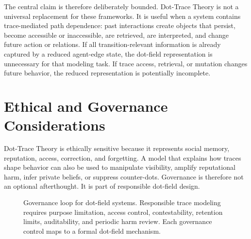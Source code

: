 \documentclass[11pt]{article}
\theoremstyle{remark}
\begin{document}
The central claim is therefore deliberately bounded. Dot-Trace Theory is not a universal replacement for these frameworks. It is useful when a system contains trace-mediated path dependence: past interactions create objects that persist, become accessible or inaccessible, are retrieved, are interpreted, and change future action or relations. If all transition-relevant information is already captured by a reduced agent-edge state, the dot-field representation is unnecessary for that modeling task. If trace access, retrieval, or mutation changes future behavior, the reduced representation is potentially incomplete.


\section{Ethical and Governance Considerations}\label{ethical-governance-considerations}

Dot-Trace Theory is ethically sensitive because it represents social memory, reputation, access, correction, and forgetting. A model that explains how traces shape behavior can also be used to manipulate visibility, amplify reputational harm, infer private beliefs, or suppress counter-dots. Governance is therefore not an optional afterthought. It is part of responsible dot-field design.

\begin{figure}[htbp]
\centering
{}
\caption{Governance loop for dot-field systems. Responsible trace modeling requires purpose limitation, access control, contestability, retention limits, auditability, and periodic harm review. Each governance control maps to a formal dot-field mechanism.}
\label{fig:governance-loop}
\end{figure}
\end{document}
